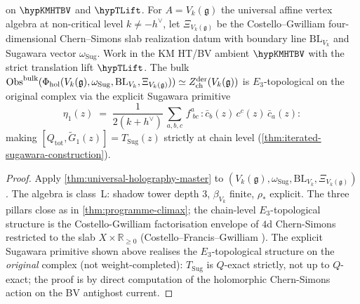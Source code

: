 \begin{corollary}
\ClaimStatusConditional{} on \(\hypKMHTBV\) and \(\hypTLift\).
For \(A=V_k(\mathfrak g)\) the universal affine vertex algebra at
non-critical level \(k\neq -h^\vee\), let
	\(\Xi_{V_k(\mathfrak g)}\) be the Costello--Gwilliam
four-dimensional Chern--Simons slab realization datum with boundary
line \(\mathrm{BL}_{V_k}\) and Sugawara vector
\(\omega_{\mathrm{Sug}}\). Work in the KM HT/BV ambient
\(\hypKMHTBV\) with the strict translation lift \(\hypTLift\). The bulk
$\mathrm{Obs}^{\mathrm{bulk}}(\Phi_{\mathrm{hol}}(V_{k}(\mathfrak{g}),\omega_{\mathrm{Sug}},\mathrm{BL}_{V_k},\Xi_{V_k(\mathfrak g)}))
\simeq Z^{\mathrm{der}}_{\mathrm{ch}}(V_{k}(\mathfrak{g}))$ is
$E_{3}$-topological on the original complex via the explicit
Sugawara primitive
\[
 \eta_{1}(z) \;=\;
 \frac{1}{2(k+h^{\vee})}\,
 \sum_{a, b, c}\,
 f^{a}_{\;bc}
 \,
 {:}\bar{c}_{b}(z)\, c^{c}(z)\, \bar{c}_{a}(z){:}
\]
making $[Q_{\mathrm{tot}}, \tilde{G}_{1}(z)] = T_{\mathrm{Sug}}(z)$
strictly at chain level
(\cref{thm:iterated-sugawara-construction}).
\end{corollary}

\begin{proof}
Apply \cref{thm:universal-holography-master} to
\((V_k(\mathfrak g),\omega_{\mathrm{Sug}},\mathrm{BL}_{V_k},
\Xi_{V_k(\mathfrak g)})\). The algebra is class~L: shadow tower
depth $3$, $\beta_{V_{k}}$ finite, $\rho_{*}$ explicit. The three
pillars close as in \cref{thm:programme-climax}; the chain-level
$E_{3}$-topological structure is the Costello-Gwilliam
factorisation envelope of $4$d Chern-Simons restricted to the slab
$X \times \mathbb{R}_{\ge 0}$ (Costello--Francis--Gwilliam
\cite{CFG26}). The
explicit Sugawara primitive shown above realises the
$E_{3}$-topological structure on the \emph{original} complex (not
weight-completed): $T_{\mathrm{Sug}}$ is $Q$-exact strictly, not up
to $Q$-exact; the proof is by direct computation of the
holomorphic Chern-Simons action on the BV antighost current.
\end{proof}

